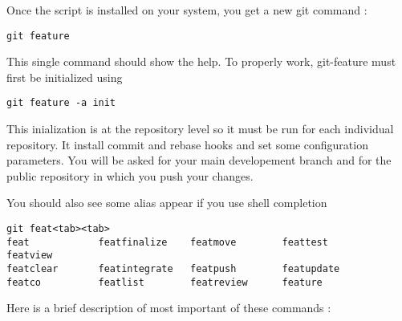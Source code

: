 Once the script is installed on your system, you get a new git command :
\begin{lstlisting}
git feature
\end{lstlisting}
This single command should show the help. To properly work, git-feature must first be initialized using
\begin{lstlisting}
git feature -a init
\end{lstlisting}
This inialization is at the repository level so it must be run for each individual repository. It install commit and rebase hooks and set some configuration parameters. You will be asked for your main developement branch and for the public repository in which you push your changes.

You should also see some alias appear if you use shell completion
\begin{lstlisting}
git feat<tab><tab>
feat            featfinalize    featmove        feattest        featview
featclear       featintegrate   featpush        featupdate
featco          featlist        featreview      feature
\end{lstlisting}
Here is a brief description of most important of these commands :
